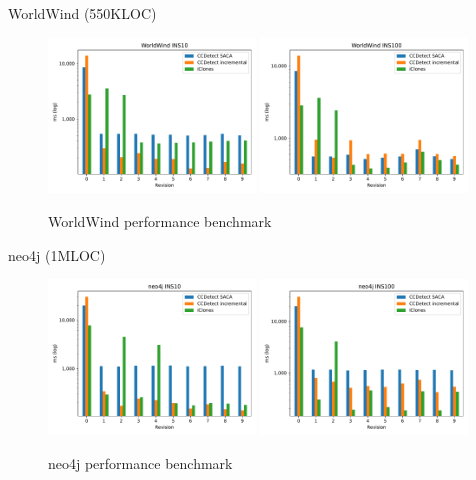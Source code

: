 \documentclass[aspectratio=1610, xcolor=table]{beamer}
\begin{document}
\begin{frame}{WorldWind (550KLOC)}
    \begin{figure}[H]
    \begin{center}
        \includegraphics[width=0.49\textwidth]{figures/performancegraphs/WorldWind_INS10.pdf}
        \includegraphics[width=0.49\textwidth]{figures/performancegraphs/WorldWind_INS100.pdf}
    \end{center}
    \caption{WorldWind performance benchmark}
    \label{fig:WorldWind}
\end{figure}

\end{frame}

\begin{frame}{neo4j (1MLOC)}
    \begin{figure}[H]
    \begin{center}
        \includegraphics[width=0.49\textwidth]{figures/performancegraphs/neo4j_INS10.pdf}
        \includegraphics[width=0.49\textwidth]{figures/performancegraphs/neo4j_INS100.pdf}
    \end{center}
    \caption{neo4j performance benchmark}
    \label{fig:neo4j}
\end{figure}

\end{frame}
\end{document}
